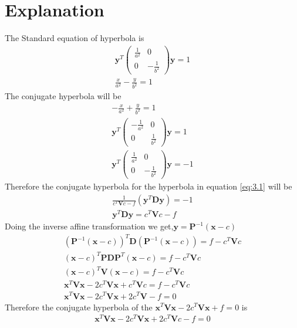 \documentclass[journal,12pt,twocolumn]{IEEEtran}
\providecommand{\brak}[1]{\ensuremath{\left(#1\right)}}
\newcommand{\myvec}[1]{\ensuremath{\begin{pmatrix}#1\end{pmatrix}}}
\numberwithin{equation}{subsection}
\let\vec\mathbf
\begin{document}
\section{Explanation}
The Standard equation of hyperbola is 
\begin{align}
    \vec{y}^T\myvec{\frac{1}{a^2}&0\\0&-\frac{1}{b^2}}\vec{y}=1\\
    \frac{x}{a^2}-\frac{y}{b^2}=1
\end{align}
The conjugate hyperbola will be 
\begin{align}
    -\frac{x}{a^2}+\frac{y}{b^2}=1\\
    \vec{y}^T\myvec{-\frac{1}{a^2}&0\\0&\frac{1}{b^2}}\vec{y}=1\\
    \vec{y}^T\myvec{\frac{1}{a^2}&0\\0&-\frac{1}{b^2}}\vec{y}=-1
\end{align}
Therefore the conjugate hyperbola for the hyperbola in equation \eqref{eq:3.1} will be
\begin{align}
    \frac{1}{c^T\vec{V}c-f}\brak{\vec{y}^T\vec{D}\vec{y}}=-1\label{eq:4.1}\\
    \vec{y}^T\vec{D}\vec{y}=c^T\vec{V}c-f
\end{align}
Doing the inverse affine transformation we get,$\vec{y}=\vec{P}^{-1}\brak{\vec{x}-c}$
\begin{align}
    \brak{\vec{P}^{-1}\brak{\vec{x}-c}}^T\vec{D}\brak{\vec{P}^{-1}\brak{\vec{x}-c}}=f-c^T\vec{V}c\\
    \brak{\vec{x}-c}^T\vec{P}\vec{D}\vec{P}^T\brak{\vec{x}-c}=f-c^T\vec{V}c\\
    \brak{\vec{x}-c}^T\vec{V}\brak{\vec{x}-c}=f-c^T\vec{V}c\\
    \vec{x}^T\vec{V}\vec{x}-2c^T\vec{V}\vec{x}+c^T\vec{V}c=f-c^T\vec{V}c\\
    \vec{x}^T\vec{V}\vec{x}-2c^T\vec{V}\vec{x}+2c^T\vec{V}-f=0
\end{align}
Therefore the conjugate hyperbola of the $\vec{x}^T\vec{V}\vec{x}-2c^T\vec{V}\vec{x}+f=0$ is
\begin{align}
    \vec{x}^T\vec{V}\vec{x}-2c^T\vec{V}\vec{x}+2c^T\vec{V}c-f=0
\end{align}
\end{document}
